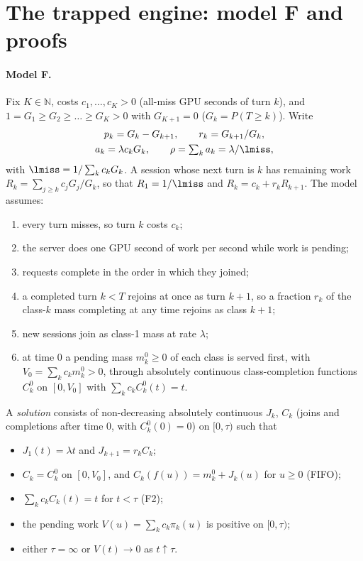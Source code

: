 \section{The trapped engine: model F and proofs}\label{app:trap}

\paragraph{Model F.} Fix $K\in\mathbb N$, costs $c_1,\dots,c_K>0$ (all-miss GPU seconds of turn $k$), and
$1=G_1\ge G_2\ge\dots\ge G_K>0$ with $G_{K+1}=0$ ($G_k=P(T\ge k)$). Write
\begin{gather*}
p_k=G_k-G_{k+1},\qquad r_k=G_{k+1}/G_k,\\
a_k=\lambda c_kG_k,\qquad \rho=\textstyle\sum_ka_k=\lambda/\lmiss,
\end{gather*}
with $\lmiss=1/\sum_kc_kG_k$. A session whose next turn is $k$ has remaining work $R_k=\sum_{j\ge k}c_jG_j/G_k$, so that
$R_1=1/\lmiss$ and $R_k=c_k+r_kR_{k+1}$. The model assumes:
\begin{enumerate}[(F1),leftmargin=*,nosep]
\item every turn misses, so turn $k$ costs $c_k$;
\item the server does one GPU second of work per second while work is pending;
\item requests complete in the order in which they joined;
\item a completed turn $k<T$ rejoins at once as turn $k+1$, so a fraction $r_k$ of the class-$k$ mass completing at any time
rejoins as class $k+1$;
\item new sessions join as class-1 mass at rate $\lambda$;
\item at time 0 a pending mass $m^0_k\ge0$ of each class is served first, with $V_0=\sum_kc_km^0_k>0$, through absolutely
continuous class-completion functions $C^0_k$ on $[0,V_0]$ with $\sum_kc_kC^0_k(t)=t$.
\end{enumerate}
A \emph{solution} consists of non-decreasing absolutely continuous $J_k$, $C_k$ (joins and completions after time 0, with
$C^0_k(0)=0$) on $[0,\tau)$ such that
\begin{itemize}[leftmargin=*,nosep]
\item $J_1(t)=\lambda t$ and $J_{k+1}=r_kC_k$;
\item $C_k=C^0_k$ on $[0,V_0]$, and $C_k(f(u))=m^0_k+J_k(u)$ for $u\ge0$ (FIFO);
\item $\sum_kc_kC_k(t)=t$ for $t<\tau$ (F2);
\item the pending work $V(u)=\sum_kc_k\pi_k(u)$ is positive on $[0,\tau)$;
\item either $\tau=\infty$ or $V(t)\to0$ as $t\uparrow\tau$.
\end{itemize}
